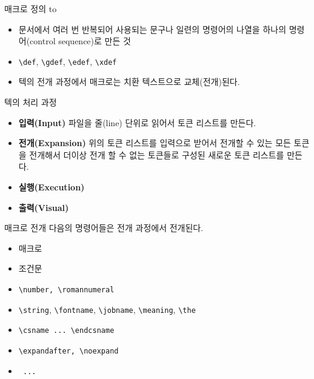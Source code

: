 \documentclass{beamer}
\begin{document}
%
\begin{frame}[fragile]{매크로 정의}
  \medskip
  \hbox to
  \smallskip
  \begin{itemize}
  \item 문서에서 여러 번 반복되어 사용되는 문구나 일련의 명령어의 나열을
    하나의 명령어(control sequence)로 만든 것
  \item \verb+\def+, \verb+\gdef+, \verb+\edef+, \verb+\xdef+
  \item 텍의 \alert{전개 과정}에서 매크로는 치환 텍스트으로 교체(전개)된다.
%    
  \end{itemize}
\end{frame}


%
\begin{frame}{텍의 처리 과정}  
  \begin{itemize}
  \item \alert{\bf 입력(Input)} 파일을 줄(line) 단위로 읽어서
    \alert{토큰 리스트}를 만든다.
  \item \alert{\bf 전개(Expansion)} 위의 토큰 리스트를 입력으로
    받어서 전개할 수 있는
    모든 토큰을 전개해서 더이상 전개 할 수 없는 토큰들로 구성된
    새로운 토큰 리스트를 만든다.
  \item \alert{\bf 실행(Execution)}
  \item \alert{\bf 출력(Visual)}
  \end{itemize}
\end{frame}


%
\begin{frame}[fragile]{매크로 전개}
  다음의 명령어들은 전개 과정에서 전개된다.
  \begin{itemize}
  \item 매크로
  \item 조건문
  \item \verb+\number, \romannumeral+
  \item \verb+\string+, \verb+\fontname+, \verb+\jobname+,
    \verb+\meaning+, \verb+\the+
  \item \verb+\csname ... \endcsname+
  \item \verb+\expandafter, \noexpand+
  \item \verb+ ... +
  \end{itemize}
\end{frame}
\end{document}
